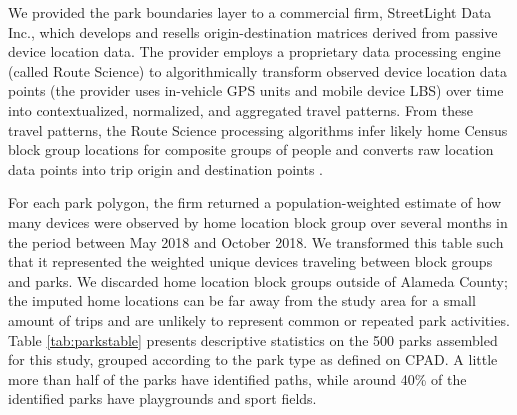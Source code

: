 \documentclass[3p, authoryear, review]{elsarticle} %
\begin{document}
We provided the park boundaries layer to a commercial firm, StreetLight Data
Inc., which develops and resells origin-destination matrices derived from
passive device location data. The provider employs a proprietary data processing
engine (called Route Science) to algorithmically transform observed device
location data points (the provider uses in-vehicle GPS units and mobile device
LBS) over time into contextualized, normalized, and aggregated travel patterns.
From these travel patterns, the Route Science processing algorithms infer likely
home Census block group locations for composite groups of people and converts
raw location data points into trip origin and destination points \citep{Pan2006, Friedrich2010}.

For each park polygon, the firm returned a population-weighted estimate of how
many devices were observed by home location block group over several months in
the period between May 2018 and October 2018. We transformed this table such
that it represented the weighted unique devices traveling between block groups
and parks. We discarded home location block groups outside of Alameda County;
the imputed home locations can be far away from the study area for a small
amount of trips and are unlikely to represent common or repeated park
activities. Table \ref{tab:parkstable} presents descriptive statistics on
the 500 parks assembled for this study, grouped according to the
park type as defined on CPAD. A little more than half of the parks have
identified paths, while around 40\% of the identified parks have playgrounds and
sport fields.
\end{document}
